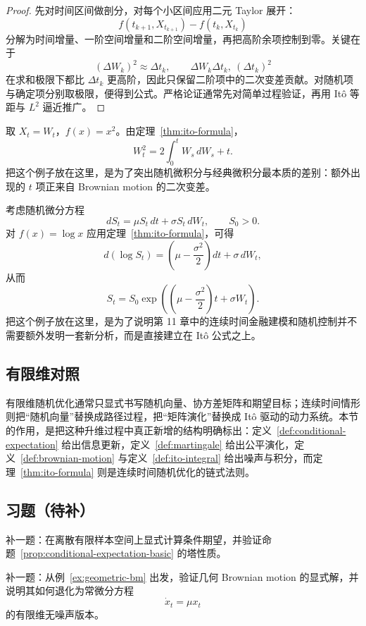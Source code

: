 \begin{proof}
先对时间区间做剖分，对每个小区间应用二元 Taylor 展开：
\[
f(t_{k+1},X_{t_{k+1}})-f(t_k,X_{t_k})
\]
分解为时间增量、一阶空间增量和二阶空间增量，再把高阶余项控制到零。关键在于
\[
(\Delta W_k)^2\approx \Delta t_k,\qquad \Delta W_k\Delta t_k,\ (\Delta t_k)^2
\]
在求和极限下都比 $\Delta t_k$ 更高阶，因此只保留二阶项中的二次变差贡献。对随机项与确定项分别取极限，便得到公式。严格论证通常先对简单过程验证，再用 Itô 等距与 $L^2$ 逼近推广。
\end{proof}

\begin{example}\label{ex:ito-quadratic}
取 $X_t=W_t$，$f(x)=x^2$。由定理~\ref{thm:ito-formula}，
\[
W_t^2=2\int_0^t W_s\,dW_s+t.
\]
把这个例子放在这里，是为了突出随机微积分与经典微积分最本质的差别：额外出现的 $t$ 项正来自 Brownian motion 的二次变差。
\end{example}

\begin{example}\label{ex:geometric-bm}
考虑随机微分方程
\[
dS_t=\mu S_t\,dt+\sigma S_t\,dW_t,\qquad S_0>0.
\]
对 $f(x)=\log x$ 应用定理~\ref{thm:ito-formula}，可得
\[
d(\log S_t)=\left(\mu-\frac{\sigma^2}{2}\right)dt+\sigma\,dW_t,
\]
从而
\[
S_t=S_0\exp\left(\left(\mu-\frac{\sigma^2}{2}\right)t+\sigma W_t\right).
\]
把这个例子放在这里，是为了说明第 11 章中的连续时间金融建模和随机控制并不需要额外发明一套新分析，而是直接建立在 Itô 公式之上。
\end{example}

\subsection*{有限维对照}

有限维随机优化通常只显式书写随机向量、协方差矩阵和期望目标；连续时间情形则把“随机向量”替换成路径过程，把“矩阵演化”替换成 Itô 驱动的动力系统。本节的作用，是把这种升维过程中真正新增的结构明确标出：定义~\ref{def:conditional-expectation} 给出信息更新，定义~\ref{def:martingale} 给出公平演化，定义~\ref{def:brownian-motion} 与定义~\ref{def:ito-integral} 给出噪声与积分，而定理~\ref{thm:ito-formula} 则是连续时间随机优化的链式法则。

\subsection*{习题（待补）}

\begin{exercise}[条件期望占位]\label{exr:conditional-expectation-placeholder}
补一题：在离散有限样本空间上显式计算条件期望，并验证命题~\ref{prop:conditional-expectation-basic} 的塔性质。
\end{exercise}

\begin{exercise}\label{exr:ito-formula-placeholder}
补一题：从例~\ref{ex:geometric-bm} 出发，验证几何 Brownian motion 的显式解，并说明其如何退化为常微分方程
\[
\dot x_t=\mu x_t
\]
的有限维无噪声版本。
\end{exercise}
